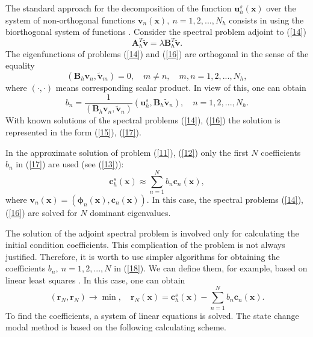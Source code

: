 \documentclass[authoryear]{elsarticle}
\begin{document}
The standard approach for the decomposition of the function  $\bm u_h^s (\bm x) $ 
over the system of non-orthogonal functions $\bm v_n(\bm x), \ n = 1,2, ..., N_h$ 
consists in using the biorthogonal system of functions 
\citep{henry1975nuclear,brezinski1991biorthogonality}. 
Consider the spectral problem adjoint to (\ref{14})  
\begin{equation}\label{16}
 \bm A_h^T \widetilde{\bm v}  = \lambda  \bm B_h^T \widetilde{\bm v} .
\end{equation} 
The eigenfunctions of problems  (\ref{14}) and (\ref{16}) are orthogonal \citep{Laub2005,Ortega1987}  in the sense of the equality
\[
  (\bm B_h \bm v_n, \widetilde{\bm v}_m)= 0, 
  \quad m \neq n,
  \quad m, n = 1,2, ..., N_h , 
\] 
where $(\cdot, \cdot)$ means corresponding scalar product. 
In view of this, one can obtain
\begin{equation}\label{17}
 b_n = \frac{1}{(\bm B_h \bm v_n, \widetilde{\bm v}_n)} (\bm u_h^s, \bm B_h \widetilde{\bm v}_n),
 \quad n = 1,2, ..., N_h .  
\end{equation} 
With known solutions of the spectral problems  (\ref{14}), (\ref{16})  
the solution is represented in the form (\ref{15}), (\ref{17}).

In the approximate solution of problem   (\ref{11}), (\ref{12}) only the first $N$ coefficients  $b_n$ in (\ref{17}) are used (see (\ref{13})):
\begin{equation}\label{18}
 \bm c_h^s (\bm x) \approx  \sum_{n=1}^{N} b_n \bm c_n(\bm x) ,
\end{equation} 
where $\bm v_n (\bm x) = (\bm \phi_n (\bm x), \bm c_n (\bm x))$.
In this case, the spectral problems  (\ref{14}), (\ref{16}) are solved for $N$ dominant 
eigenvalues.

The solution of the adjoint spectral problem is involved only for calculating the initial condition coefficients. This complication of the problem is not always justified. Therefore, it is worth to use simpler algorithms for obtaining the coefficients  $b_n, \ n = 1,2, ..., N$ in (\ref{18}).
We can define them, for example, based on linear least squares  \citep{LSPk1996,verdu2014modal}.
In this case, one can obtain
\begin{equation}\label{19}
 (\bm r_N, \bm r_N) \longrightarrow \min, 
 \quad \bm r_N (\bm x)  = \bm c_h^s (\bm x) -  \sum_{n=1}^{N} b_n \bm c_n(\bm x) .
\end{equation} 
To find the coefficients, a system of linear equations is solved. The state change modal method is based on the following calculating scheme.
\end{document}
